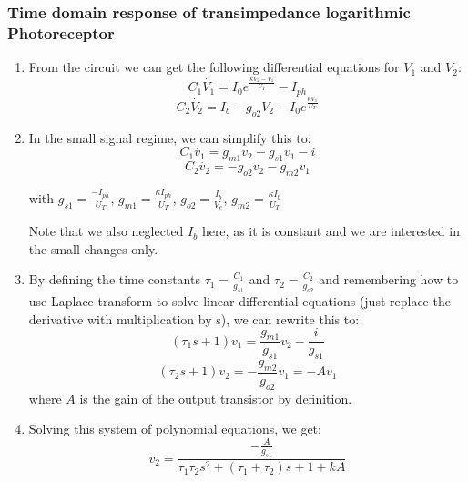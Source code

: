 \subsubsection{Time domain response of transimpedance logarithmic Photoreceptor}

\begin{enumerate}
    \item From the circuit we can get the following differential equations for $V_1$ and $V_2$:
    \begin{equation}
        C_1\dot{V_1} = I_0 e^{\frac{\kappa V_2 - V_1}{U_T}} - I_{ph}
    \end{equation}
    \begin{equation}
        C_2\dot{V_2} = I_b - g_{o2}V_2 - I_0 e^{\frac{\kappa V_1}{U_T}} 
    \end{equation}
    
    \item In the small signal regime, we can simplify this to:
    \begin{equation}
        C_1\dot{v_1} = g_{m1} v_2 - g_{s1} v_1 - i
    \end{equation}
    \begin{equation}
        C_2\dot{v_2} = -g_{o2}v_2 - g_{m2}v_1
    \end{equation}
    
    with $g_{s1} = \frac{-I_{ph}}{U_T}$, $g_{m1} = \frac{\kappa I_{ph}}{U_T}$, $g_{o2} = \frac{I_b}{V_e}$, $g_{m2} = \frac{\kappa I_b}{U_T}$
    
    Note that we also neglected $I_b$ here, as it is constant and we are interested in the small changes only.
    
    \item By defining the time constants $\tau_1 = \frac{C_1}{g_{s1}}$ and $\tau_2 = \frac{C_2}{g_{o2}}$ and remembering how to use Laplace transform to solve linear differential equations (just replace the derivative with multiplication by s), we can rewrite this to:
    \begin{equation}
        (\tau_1 s + 1) v_1= \frac{g_{m1}}{g_{s1}} v_2 - \frac{i}{g_{s1}}
    \end{equation}
    \begin{equation}
       (\tau_2 s + 1) v_2 = - \frac{g_{m2}}{g_{o2}}v_1 = -A v_1
    \end{equation}
    where $A$ is the gain of the output transistor by definition.
    
    \item Solving this system of polynomial equations, we get:
    \begin{equation}
        v_2 = \frac{-\frac{A}{g_{s1}}}{\tau_1 \tau_2 s^2 + (\tau_1 + \tau_2) s + 1 + kA}
    \end{equation}
    
    
\end{enumerate}

  